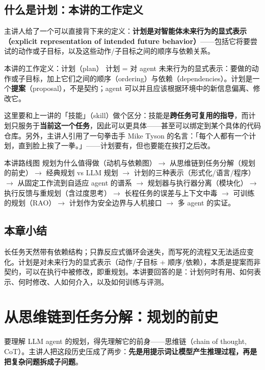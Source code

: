 \documentclass[a4paper]{article}
\begin{document}
\subsection{什么是计划：本讲的工作定义}

主讲人给了一个可以直接背下来的定义：\textbf{计划是对智能体未来行为的显式表示（explicit representation of intended future behavior）}——包括它将要尝试的动作或子目标，以及这些动作/子目标之间的顺序与依赖关系。

\begin{importantbox}{本讲的工作定义：计划（plan）}
计划 = 对 agent 未来行为的显式表示：要做的动作或子目标，加上它们之间的顺序（ordering）与依赖（dependencies）。计划是一个\textbf{提案}（proposal），不是契约；agent 可以并且应该根据环境中的新信息偏离、修改它。
\end{importantbox}

这里要和上一讲的「技能」（skill）做个区分：技能是\textbf{跨任务可复用的指导}，而计划只服务于\textbf{当前这一个任务}，因此可以更具体——甚至可以绑定到某个具体的代码仓库。另外，主讲人引用了一句拳击手 Mike Tyson 的名言：「每个人都有一个计划，直到脸上挨了一拳。」——计划要有，但也要能在挨打之后改。

\begin{knowledgebox}{本讲路线图}
规划为什么值得做（动机与依赖图）$\rightarrow$ 从思维链到任务分解（规划的前史）$\rightarrow$ 经典规划 vs LLM 规划 $\rightarrow$ 计划的三种表示（形式化/语言/程序）$\rightarrow$ 从固定工作流到自适应 agent 的谱系 $\rightarrow$ 规划器与执行器分离（模块化）$\rightarrow$ 执行反馈与重规划（含过度思考）$\rightarrow$ 长程任务的误差与上下文中毒 $\rightarrow$ 可训练的规划（RAO）$\rightarrow$ 计划作为安全边界与人机接口 $\rightarrow$ 多 agent 的实证。
\end{knowledgebox}

\subsection{本章小结}
长任务天然带有依赖结构；只靠反应式循环会迷失，而写死的流程又无法适应变化。计划是对未来行为的显式表示（动作/子目标 + 顺序/依赖），本质是提案而非契约，可以在执行中被修改，即重规划。本讲要回答的是：计划何时有用、如何表示、何时修改、人如何介入，以及如何训练与评测。

\section{从思维链到任务分解：规划的前史}

要理解 LLM agent 的规划，得先理解它的前身——思维链（chain of thought, CoT）。主讲人把这段历史压成了两步：\textbf{先是用提示词让模型产生推理过程，再是把复杂问题拆成子问题}。
\end{document}
